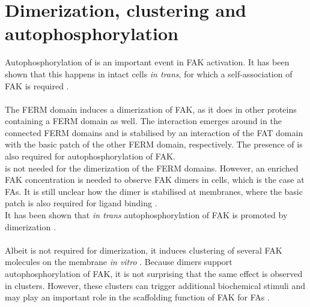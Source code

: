 \section{Dimerization, clustering and autophosphorylation}
\label{intro:clustering}
Autophosphorylation of  is an important event in FAK activation. It has been shown that this happens in intact cells \textit{in trans}, for which a self-association of FAK is required \autocite{transAuto}.\\
\\
The FERM domain induces a dimerization of FAK, as it does in other proteins containing a FERM domain as well. %
The interaction emerges around  in the connected FERM domains and is stabilised by an interaction of the FAT domain with the basic patch of the other FERM domain, respectively. The presence of  is also required for autophosphorylation of FAK.\\
\pip{} is not needed for the dimerization of the FERM domains. However, an enriched FAK concentration is needed to observe FAK dimers in cells, which is the case at FAs. It is still unclear how the dimer is stabilised at membranes, where the basic patch is also required for ligand binding \autocite{fakdimers}.\\
It has been shown that \textit{in trans} autophosphorylation of FAK is promoted by dimerization \autocite{dimersVsClusters}.\\
\\
Albeit \pip{} is not required for dimerization, it induces clustering of several FAK molecules on the membrane \textit{in vitro} \autocite{pap001}. Because dimers support autophosphorylation of FAK, it is not surprising that the same effect is observed in clusters. However, these clusters can trigger additional biochemical stimuli \autocite{dimersVsClusters} and may play an important role in the scaffolding function of FAK for FAs \autocite{pap001}.

